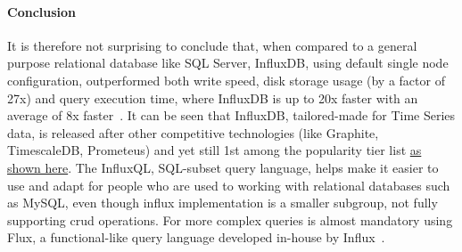 \paragraph{Conclusion}
It is therefore not surprising to conclude that, when compared to a general purpose relational database like SQL Server, InfluxDB, using default single node configuration, outperformed both write speed, disk storage usage (by a factor of 27x) and query execution time, where InfluxDB is up to 20x faster with an average of 8x faster~\cite{Misc:noor_2017_universit}.
It can be seen that InfluxDB, tailored-made for Time Series data, is released after other competitive technologies (like Graphite, TimescaleDB, Prometeus) and yet still 1st among the popularity tier list \href{https://db-engines.com/en/ranking_trend/time+series+dbms}{as shown here}.
The InfluxQL, SQL-subset query language, helps make it easier to use and adapt for people who are used to working with relational databases such as MySQL, even though influx
implementation is a smaller subgroup, not fully supporting \ac{crud} operations. For more complex queries is almost mandatory using Flux, a functional-like query language developed in-house by Influx~\cite{Misc:influx_docs}.
